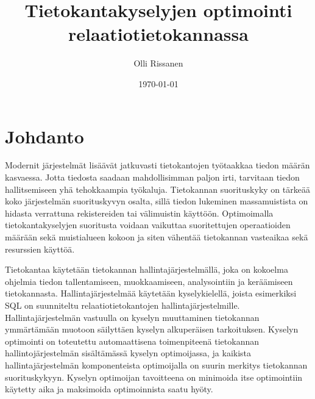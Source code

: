 \documentclass[finnish]{tktltiki2}
\title{Tietokantakyselyjen optimointi relaatiotietokannassa}
\author{Olli Rissanen}
\date{\today}
\theoremstyle{definition}
\theoremstyle{remark}
\begin{document}

\maketitle
\makeabstract
\tableofcontents
\newpage


\section{Johdanto}
Modernit järjestelmät lisäävät jatkuvasti tietokantojen työtaakkaa tiedon määrän kasvaessa. Jotta tiedosta saadaan mahdollisimman paljon irti, tarvitaan tiedon hallitsemiseen yhä tehokkaampia työkaluja. %
Tietokannan suorituskyky on tärkeää koko järjestelmän suorituskyvyn osalta, sillä tiedon lukeminen massamuistista on hidasta verrattuna rekistereiden tai välimuistin käyttöön. Optimoimalla tietokantakyselyjen suoritusta voidaan vaikuttaa suoritettujen operaatioiden määrään sekä muistialueen kokoon ja siten vähentää tietokannan vasteaikaa sekä resurssien käyttöä. \cite{mor2012}
	
% 

Tietokantaa käytetään tietokannan hallintajärjestelmällä, joka on kokoelma ohjelmia tiedon tallentamiseen, muokkaamiseen, analysointiin ja keräämiseen tietokannasta. Hallintajärjestelmää käytetään kyselykielellä, joista esimerkiksi SQL \cite{5391051} on suunniteltu relaatiotietokantojen hallintajärjestelmille. Hallintajärjestelmän vastuulla on kyselyn muuttaminen tietokannan ymmärtämään muotoon säilyttäen kyselyn alkuperäisen tarkoituksen. Kyselyn optimointi on toteutettu automaattisena toimenpiteenä tietokannan hallintojärjestelmän sisältämässä kyselyn optimoijassa, ja kaikista hallintajärjestelmän komponenteista optimoijalla on suurin merkitys tietokannan suorituskykyyn. \cite{mor2012} Kyselyn optimoijan tavoitteena on minimoida itse optimointiin käytetty aika ja maksimoida optimoinnista saatu hyöty. \cite{jarke1984} 
\end{document}
